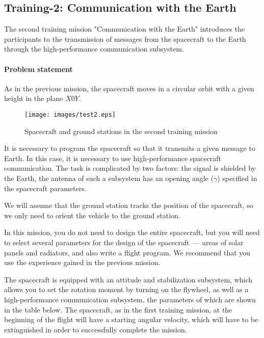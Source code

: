 \documentclass[12pt,a4paper]{article}
\begin{document}
\clearpage
\subsection{Training-2: Communication with the Earth}
\label{Sec:Test2}

The second training mission "Communication with the Earth" introduces the participants to the transmission of messages from the spacecraft to the Earth through the high-performance communication subsystem.

\paragraph{Problem statement}

As in the previous mission, the spacecraft moves in a circular orbit with a given height in the plane
$X0Y$.

\begin{figure}[tbh]
  \begin{center}
    \texttt{[image: images/test2.eps]}
    \caption{Spacecraft and ground stations in the second training mission}
    \label{Pic:test2}
  \end{center}
\end{figure}

It is necessary to program the spacecraft so that it transmits a given message to Earth. In this case, it is necessary to use high-performance spacecraft communication. The task is complicated by two factors: the signal is shielded by the Earth, the antenna of such a subsystem has an opening angle ($\gamma$) specified in the spacecraft parameters.

We will assume that the ground station tracks the position of the spacecraft, so we only need to orient the vehicle to the ground station.

In this mission, you do not need to design the entire spacecraft, but you will need to select several parameters for the design of the spacecraft~--- areas of solar panels and radiators, and also write a flight program. We recommend that you use the experience gained in the previous mission.

The spacecraft is equipped with an attitude and stabilization subsystem, which allows you to set the rotation moment by turning on the flywheel, as well as a high-performance communication subsystem, the parameters of which are shown in the table below. The spacecraft, as in the first training mission, at the beginning of the flight will have a starting angular velocity, which will have to be extinguished in order to successfully complete the mission.
\end{document}

